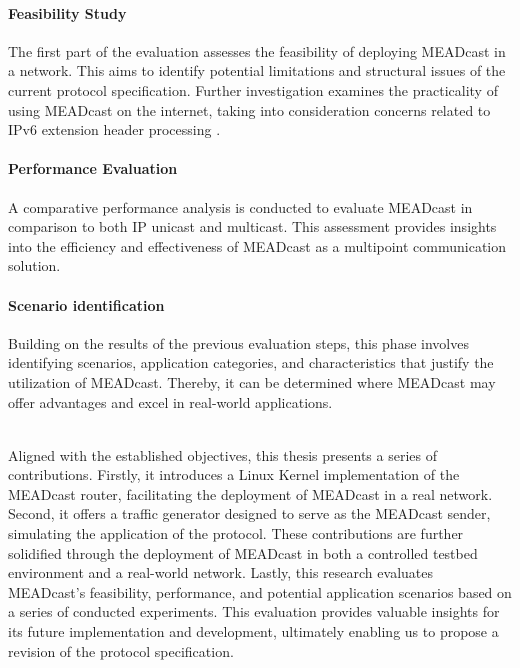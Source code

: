 \paragraph{Feasibility Study} %
\label{par:Feasibility Study}
The first part of the evaluation assesses the feasibility of deploying
    MEADcast in a network.
This aims to identify potential limitations and structural issues of the
    current protocol specification.
Further investigation examines the practicality of using MEADcast on the
    internet, taking into consideration concerns related to IPv6 extension
    header processing \cite{rfc7872_ext_hdrs_drop_rate}.

\paragraph{Performance Evaluation} %
\label{par:Performance Evaluation}
A comparative performance analysis is conducted to evaluate MEADcast in
    comparison to both IP unicast and multicast.
This assessment provides insights into the efficiency and effectiveness of
    MEADcast as a multipoint communication solution.

\paragraph{Scenario identification} %
\label{par:Scenario identification}
Building on the results of the previous evaluation steps, this phase involves
    identifying scenarios, application categories, and characteristics that
    justify the utilization of MEADcast.
Thereby, it can be determined where MEADcast may offer advantages and excel in
    real-world applications.
    
\noindent\\
Aligned with the established objectives, this thesis presents a series of
    contributions.
Firstly, it introduces a Linux Kernel implementation of the MEADcast router,
    facilitating the deployment of MEADcast in a real network.
Second, it offers a traffic generator designed to serve as the MEADcast sender,
    simulating the application of the protocol.
These contributions are further solidified through the deployment of MEADcast
    in both a controlled testbed environment and a real-world network.
Lastly, this research evaluates MEADcast's feasibility, performance, and
    potential application scenarios based on a series of conducted experiments.
This evaluation provides valuable insights for its future implementation and
    development, ultimately enabling us to propose a revision of the protocol
    specification.

